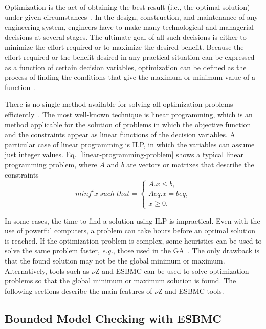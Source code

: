 Optimization is the act of obtaining the best result (i.e., the optimal solution) under given circumstances~\cite{Rao2009}. In the design, construction, and maintenance of any engineering system, engineers have to make many technological and managerial decisions at several stages. The ultimate goal of all such decisions is either to minimize the effort required or to maximize the desired benefit. Because the effort required or the benefit desired in any practical situation can be expressed as a function of certain decision variables, optimization can be defined as the process of finding the conditions that give the maximum or minimum value of a function~\cite{Rao2009}.

There is no single method available for solving all optimization problems efficiently~\cite{Rao2009}. The most well-known technique is linear programming, which is an method applicable for the solution of problems in which the objective function and the constraints appear as linear functions of the decision variables. A particular case of linear programming is ILP, in which the variables can assume just integer values. Eq.~\ref{linear-programming-problem} shows a typical linear programming problem, where $A$ and $b$ are vectors or matrixes that describe the constraints
\begin{equation}
\label{linear-programming-problem}
  minf^t x \: such \; that  = 
  \begin{cases}
    A.x \leq b, \\ 
    Aeq.x = beq, \\ 
    x \geq 0.
  \end{cases}
\end{equation}

In some cases, the time to find a solution using ILP is impractical. Even with the use of powerful computers, a problem can take hours before an optimal solution is reached. If the optimization problem is complex, some heuristics can be used to solve the same problem faster, {\it e.g.}, those used in the GA~\cite{Rao2009}. The only drawback is that the found solution may not be the global minimum or maximum. Alternatively, tools such as $\nu$Z and ESBMC can be used to solve optimization problems so that the global minimum or maximum solution is found. The following sections describe the main features of $\nu$Z and ESBMC tools.

\subsection{Bounded Model Checking with ESBMC}
\label{Bounded-Model-Checking-with-ESBMC}

